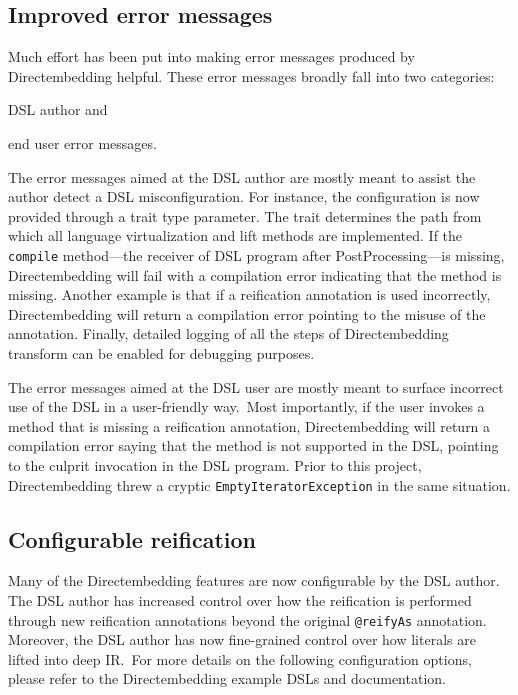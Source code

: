 \subsection{Improved error messages} %
\label{sub:Improvederrormessages}
Much effort has been put into making error messages produced by Directembedding helpful.
These error messages broadly fall into two categories:
\begin{inparaenum}[i)]
    \item DSL author and
    \item end user error messages.
\end{inparaenum}


The error messages aimed at the DSL author are mostly meant to assist the author detect a DSL misconfiguration.
For instance, the configuration is now provided through a trait type parameter.
The trait determines the path from which all language virtualization and lift methods are implemented.
If the \texttt{compile} method---the receiver of DSL program after PostProcessing---is missing, Directembedding will fail with a compilation error indicating that the method is missing.
Another example is that if a reification annotation is used incorrectly, Directembedding will return a compilation error pointing to the misuse of the annotation.
Finally, detailed logging of all the steps of Directembedding transform can be enabled for debugging purposes.

The error messages aimed at the DSL user are mostly meant to surface incorrect use of the DSL in a user-friendly way.\
Most importantly, if the user invokes a method that is missing a reification annotation, Directembedding will return a compilation error saying that the method is not supported in the DSL, pointing to the culprit invocation in the DSL program.
Prior to this project, Directembedding threw a cryptic \texttt{EmptyIteratorException} in the same situation.

\subsection{Configurable reification} %
\label{sub:Configurablereification}
Many of the Directembedding features are now configurable by the DSL author.
The DSL author has increased control over how the reification is performed through new reification annotations beyond the original \texttt{@reifyAs} annotation.
Moreover, the DSL author has now fine-grained control over how literals are lifted into deep IR.\
For more details on the following configuration options, please refer to the Directembedding example DSLs and documentation.

